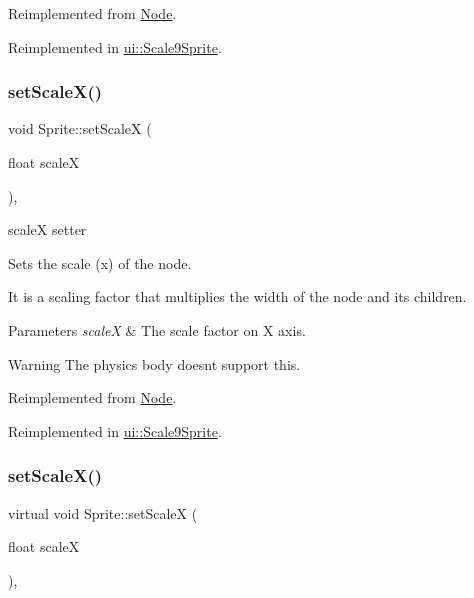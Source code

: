 Reimplemented from \hyperlink{classNode_acf0955a52f51a9d6c8b0c9267b1e8668}{Node}.



Reimplemented in \hyperlink{classui_1_1Scale9Sprite_a6824394dc8d5f26668b5e6f8b3cae3ba}{ui\+::\+Scale9\+Sprite}.

\mbox{\label{classSprite_a94c2d64bfcfd193f6b9ec927f9bb44b7}} 
\subsubsection{\texorpdfstring{set\+Scale\+X()}{setScaleX()}\hspace{0.1cm}{\footnotesize\ttfamily [1/2]}}
{\footnotesize\ttfamily void Sprite\+::set\+ScaleX (\begin{DoxyParamCaption}\item[{float}]{scaleX }\end{DoxyParamCaption})\hspace{0.3cm}{\ttfamily [override]}, {\ttfamily [virtual]}}



scaleX setter 

Sets the scale (x) of the node.

It is a scaling factor that multiplies the width of the node and its children.


\begin{DoxyParams}{Parameters}
{\em scaleX} & The scale factor on X axis.\\
\hline
\end{DoxyParams}
\begin{DoxyWarning}{Warning}
The physics body doesn\textquotesingle{}t support this. 
\end{DoxyWarning}


Reimplemented from \hyperlink{classNode_acf7f04074f7f49972e152788c090b877}{Node}.



Reimplemented in \hyperlink{classui_1_1Scale9Sprite_a7f9db0e954aca485c0d37a665927881c}{ui\+::\+Scale9\+Sprite}.

\mbox{\label{classSprite_af688d9902835f46c9690b29ab5a001a3}} 
\subsubsection{\texorpdfstring{set\+Scale\+X()}{setScaleX()}\hspace{0.1cm}{\footnotesize\ttfamily [2/2]}}
{\footnotesize\ttfamily virtual void Sprite\+::set\+ScaleX (\begin{DoxyParamCaption}\item[{float}]{scaleX }\end{DoxyParamCaption})\hspace{0.3cm}{\ttfamily [override]}, {\ttfamily [virtual]}}



